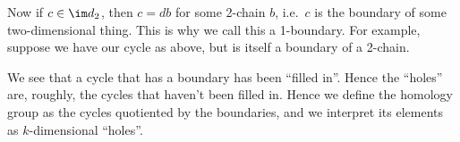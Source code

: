 \documentclass[a4paper]{article}
\begin{document}
Now if $c \in \im d_2$, then $c = db$ for some 2-chain $b$, i.e.\ $c$ is the boundary of some two-dimensional thing. This is why we call this a 1-boundary. For example, suppose we have our cycle as above, but is itself a boundary of a 2-chain.
\begin{center}
\end{center}
We see that a cycle that has a boundary has been ``filled in''. Hence the ``holes'' are, roughly, the cycles that haven't been filled in. Hence we define the homology group as the cycles quotiented by the boundaries, and we interpret its elements as $k$-dimensional ``holes''.
\end{document}
